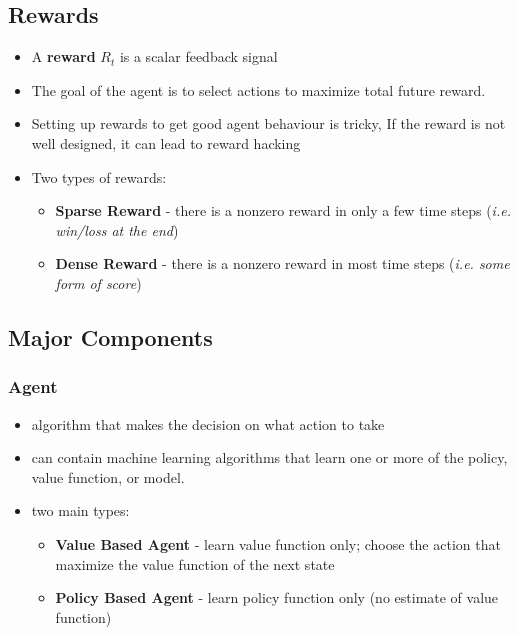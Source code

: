 \documentclass[11pt]{article}
\begin{document}
\subsection{Rewards}
\begin{itemize}
\item A \textbf{reward} $R_t$ is a scalar feedback signal
\item The goal of the agent is to select actions to maximize total future reward.
\item Setting up rewards to get good agent behaviour is tricky, If the reward is not well designed, it can lead to reward hacking
\item Two types of rewards:
\begin{itemize}
\item \textbf{Sparse Reward} - there is a nonzero reward in only a few time steps (\textit{i.e. win/loss at the end})
\item \textbf{Dense Reward} - there is a nonzero reward in most time steps (\textit{i.e. some form of score})
\end{itemize}
\end{itemize}

\subsection{Major Components}

\subsubsection{Agent}
\begin{itemize}
\item algorithm that makes the decision on what action to take
\item can contain machine learning algorithms that learn one or more of the policy, value function, or model.
\item two main types:
\begin{itemize}
\item \textbf{Value Based Agent }- learn value function only; choose the action that maximize the value function of the next state
\item \textbf{Policy Based Agent }- learn policy function only (no estimate of value function)
\end{itemize}
\end{itemize}
\end{document}
